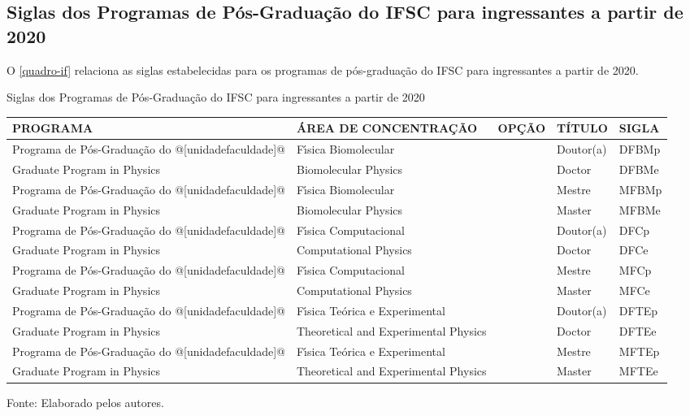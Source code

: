 \begin{apendicesenv}
\chapter{Siglas dos Programas de P\'os-Gradua\c{c}\~ao do IFSC para ingressantes a partir de 2020}
O \autoref{quadro-if} relaciona as siglas estabelecidas para os programas de p\'os-gradua\c{c}\~ao do IFSC para ingressantes a partir de 2020.
\begin{quadro}[htb] 
	\ABNTEXfontereduzida
	\caption[Siglas dos Programas de P\'os-Gradua\c{c}\~ao do IFSC para ingressantes a partir de 2020]{Siglas dos Programas de P\'os-Gradua\c{c}\~ao do IFSC para ingressantes a partir de 2020}
	\label{quadro-if}
	\begin{tabular}{|p{4.5cm}|p{4.0cm}|p{2.0cm}|p{1.5cm}|p{2.25cm}|}
		\hline
		\textbf{PROGRAMA} & \textbf{\'AREA DE CONCENTRA\c{C}\~AO} & \textbf{OP\c{C}\~AO} & \textbf{T\'ITULO} & \textbf{SIGLA}  \\
		\hline
		Programa de P\'os-Gradua\c{c}\~ao do @[unidadefaculdade]@& F\'{\i}sica Biomolecular &  & Doutor(a) & DFBMp\\
		Graduate Program in Physics & Biomolecular Physics &  & Doctor & DFBMe\\
		Programa de P\'os-Gradua\c{c}\~ao do @[unidadefaculdade]@& F\'{\i}sica Biomolecular &  & Mestre & MFBMp\\		
		Graduate Program in Physics & Biomolecular Physics &  & Master & MFBMe\\
		Programa de P\'os-Gradua\c{c}\~ao do @[unidadefaculdade]@& F\'{\i}sica Computacional &  & Doutor(a) & DFCp\\
		Graduate Program in Physics & Computational Physics &  & Doctor & DFCe\\
		Programa de P\'os-Gradua\c{c}\~ao do @[unidadefaculdade]@& F\'{\i}sica Computacional &  & Mestre & MFCp\\		
		Graduate Program in Physics & Computational Physics &  & Master & MFCe\\
		Programa de P\'os-Gradua\c{c}\~ao do @[unidadefaculdade]@& F\'{\i}sica Te\'orica e Experimental &  & Doutor(a) & DFTEp\\		
		Graduate Program in Physics & Theoretical and Experimental Physics &  & Doctor & DFTEe\\
		Programa de P\'os-Gradua\c{c}\~ao do @[unidadefaculdade]@& F\'{\i}sica Te\'orica e Experimental &  & Mestre & MFTEp\\
		Graduate Program in Physics & Theoretical and Experimental Physics &  & Master & MFTEe\\
		\hline
	\end{tabular}
	\begin{flushleft}
		Fonte: Elaborado pelos autores.\
	\end{flushleft}
\end{quadro}


\end{apendicesenv}
